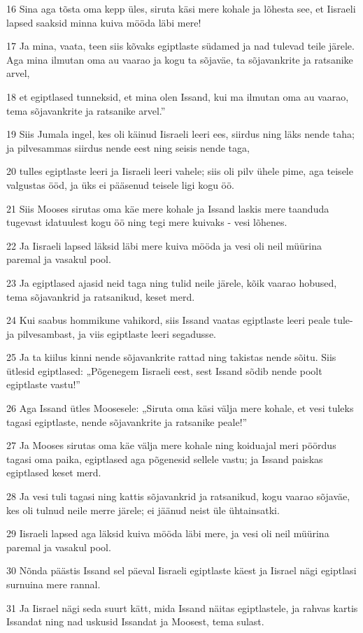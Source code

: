 \par 16 Sina aga tõsta oma kepp üles, siruta käsi mere kohale ja lõhesta see, et Iisraeli lapsed saaksid minna kuiva mööda läbi mere!
\par 17 Ja mina, vaata, teen siis kõvaks egiptlaste südamed ja nad tulevad teile järele. Aga mina ilmutan oma au vaarao ja kogu ta sõjaväe, ta sõjavankrite ja ratsanike arvel,
\par 18 et egiptlased tunneksid, et mina olen Issand, kui ma ilmutan oma au vaarao, tema sõjavankrite ja ratsanike arvel.”
\par 19 Siis Jumala ingel, kes oli käinud Iisraeli leeri ees, siirdus ning läks nende taha; ja pilvesammas siirdus nende eest ning seisis nende taga,
\par 20 tulles egiptlaste leeri ja Iisraeli leeri vahele; siis oli pilv ühele pime, aga teisele valgustas ööd, ja üks ei pääsenud teisele ligi kogu öö.
\par 21 Siis Mooses sirutas oma käe mere kohale ja Issand laskis mere taanduda tugevast idatuulest kogu öö ning tegi mere kuivaks - vesi lõhenes.
\par 22 Ja Iisraeli lapsed läksid läbi mere kuiva mööda ja vesi oli neil müürina paremal ja vasakul pool.
\par 23 Ja egiptlased ajasid neid taga ning tulid neile järele, kõik vaarao hobused, tema sõjavankrid ja ratsanikud, keset merd.
\par 24 Kui saabus hommikune vahikord, siis Issand vaatas egiptlaste leeri peale tule- ja pilvesambast, ja viis egiptlaste leeri segadusse.
\par 25 Ja ta kiilus kinni nende sõjavankrite rattad ning takistas nende sõitu. Siis ütlesid egiptlased: „Põgenegem Iisraeli eest, sest Issand sõdib nende poolt egiptlaste vastu!”
\par 26 Aga Issand ütles Moosesele: „Siruta oma käsi välja mere kohale, et vesi tuleks tagasi egiptlaste, nende sõjavankrite ja ratsanike peale!”
\par 27 Ja Mooses sirutas oma käe välja mere kohale ning koiduajal meri pöördus tagasi oma paika, egiptlased aga põgenesid sellele vastu; ja Issand paiskas egiptlased keset merd.
\par 28 Ja vesi tuli tagasi ning kattis sõjavankrid ja ratsanikud, kogu vaarao sõjaväe, kes oli tulnud neile merre järele; ei jäänud neist üle ühtainsatki.
\par 29 Iisraeli lapsed aga läksid kuiva mööda läbi mere, ja vesi oli neil müürina paremal ja vasakul pool.
\par 30 Nõnda päästis Issand sel päeval Iisraeli egiptlaste käest ja Iisrael nägi egiptlasi surnuina mere rannal.
\par 31 Ja Iisrael nägi seda suurt kätt, mida Issand näitas egiptlastele, ja rahvas kartis Issandat ning nad uskusid Issandat ja Moosest, tema sulast.

